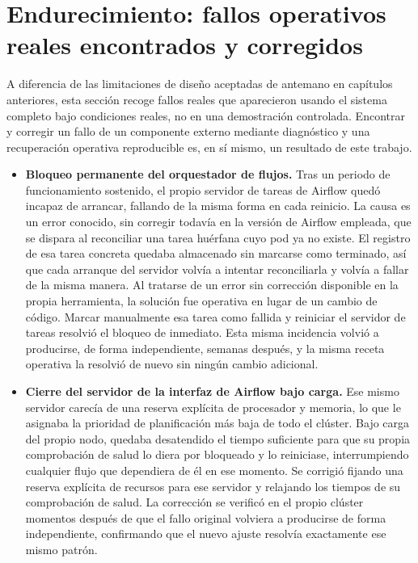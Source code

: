 \section{Endurecimiento: fallos operativos reales encontrados y corregidos}
\label{sec:visualizacion_endurecimiento}

A diferencia de las limitaciones de diseño aceptadas de antemano en
capítulos anteriores, esta sección recoge fallos reales que aparecieron
usando el sistema completo bajo condiciones reales, no en una
demostración controlada. Encontrar y corregir un fallo de un componente
externo mediante diagnóstico y una recuperación operativa reproducible es,
en sí mismo, un resultado de este trabajo.

\begin{itemize}
  \item \textbf{Bloqueo permanente del orquestador de flujos.} Tras un
  periodo de funcionamiento sostenido, el propio servidor de tareas de
  Airflow quedó incapaz de arrancar, fallando de la misma forma en cada
  reinicio. La causa es un error conocido, sin corregir todavía en la
  versión de Airflow empleada, que se dispara al reconciliar una tarea
  huérfana cuyo pod ya no existe. El registro de esa tarea concreta
  quedaba almacenado sin marcarse como terminado, así que cada arranque
  del servidor volvía a intentar reconciliarla y volvía a fallar de la
  misma manera. Al tratarse de un error sin corrección disponible en la
  propia herramienta, la solución fue operativa en lugar de un cambio de
  código. Marcar manualmente esa tarea como fallida y reiniciar el
  servidor de tareas resolvió el bloqueo de inmediato. Esta misma
  incidencia volvió a producirse, de forma independiente, semanas
  después, y la misma receta operativa la resolvió de nuevo sin ningún
  cambio adicional.
  \item \textbf{Cierre del servidor de la interfaz de Airflow bajo carga.}
  Ese mismo servidor carecía de una reserva explícita de procesador y
  memoria, lo que le asignaba la prioridad de planificación más baja de
  todo el clúster. Bajo carga del propio nodo, quedaba desatendido el
  tiempo suficiente para que su propia comprobación de salud lo diera por
  bloqueado y lo reiniciase, interrumpiendo cualquier flujo que
  dependiera de él en ese momento. Se corrigió fijando una reserva
  explícita de recursos para ese servidor y relajando los tiempos de su
  comprobación de salud. La corrección se verificó en el propio clúster
  momentos después de que el fallo original volviera a producirse de
  forma independiente, confirmando que el nuevo ajuste resolvía
  exactamente ese mismo patrón.
\end{itemize}

